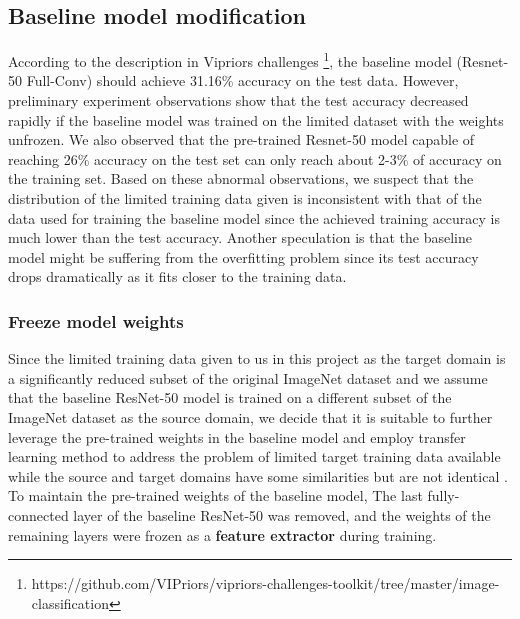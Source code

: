 \documentclass{article}
\begin{document}
\subsection{Baseline model modification}
According to the description in Vipriors challenges \footnote{https://github.com/VIPriors/vipriors-challenges-toolkit/tree/master/image-classification}, the baseline model (Resnet-50 Full-Conv) should achieve 31.16\% accuracy on the test data. However, preliminary experiment observations show that the test accuracy decreased rapidly if the baseline model was trained on the limited dataset with the weights unfrozen. We also observed that the pre-trained Resnet-50 model capable of reaching 26\% accuracy on the test set can only reach about 2-3\% of accuracy on the training set. Based on these abnormal observations, we suspect that the distribution of the limited training data given is inconsistent with that of the data used for training the baseline model since the achieved training accuracy is much lower than the test accuracy. Another speculation is that the baseline model might be suffering from the overfitting problem since its test accuracy drops dramatically as it fits closer to the training data. 

\subsubsection{Freeze model weights}
Since the limited training data given to us in this project as the target domain is a significantly reduced subset of the original ImageNet dataset and we assume that the baseline ResNet-50 model is trained on a different subset of the ImageNet dataset as the source domain, we decide that it is suitable to further leverage the pre-trained weights in the baseline model and employ transfer learning method to address the problem of limited target training data available while the source and target domains have some similarities but are not identical \cite{hussain2018study}. To maintain the pre-trained weights of the baseline model, The last fully-connected layer of the baseline ResNet-50 was removed, and the weights of the remaining layers were frozen as a \textbf{feature extractor} during training.  
\end{document}
